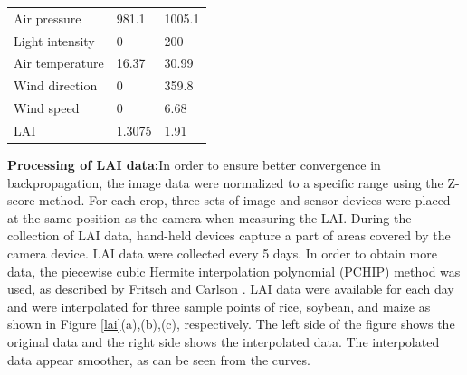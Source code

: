 \documentclass[acmsmall,manuscript, screen, review]{acmart}
\begin{document}
\begin{table}
\begin{tabular}{lll}
    Air pressure                              & 981.1                       & 1005.1                      \\
    Light intensity                           & 0                           & 200                         \\
    Air temperature                           & 16.37                       & 30.99                       \\
    Wind direction                            & 0                           & 359.8                       \\
    Wind speed                                & 0                           & 6.68                        \\
    LAI                                       & 1.3075                      & 1.91                        \\
    \hline
  \end{tabular}%
\end{table}


\textbf{Processing of LAI data:}In order to ensure better convergence in backpropagation, the image data were normalized to a specific range using the Z-score method. For each crop, three sets of image and sensor devices were placed at the same position as the camera when measuring the LAI.  During the collection of LAI data, hand-held devices capture a part of areas covered by the camera device. LAI data were collected every 5 days. In order to obtain more data, the piecewise cubic Hermite interpolation polynomial (PCHIP) method was used, as described by Fritsch and Carlson \cite{fritsch1980monotone}. LAI data were available for each day and were interpolated for three sample points of rice, soybean, and maize as shown in Figure \ref{lai}(a),(b),(c), respectively. The left side of the figure shows the original data and the right side shows the interpolated data. The interpolated data appear smoother, as can be seen from the curves.
\end{document}
